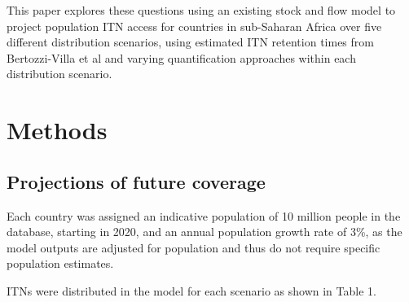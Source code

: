 \documentclass[review,
3p]{elsarticle} %
\begin{document}
This paper explores these questions using an existing stock and flow
model \citep{10.1186/s12936-022-04272-w} to project population ITN
access for countries in sub-Saharan Africa over five different
distribution scenarios, using estimated ITN retention times from
Bertozzi-Villa et al \citep{10.1038/s41467-021-23707-7} and varying
quantification approaches within each distribution scenario.

\hypertarget{methods}{%
\section{Methods}\label{methods}}

\hypertarget{projections-of-future-coverage}{%
\subsection{Projections of future
coverage}\label{projections-of-future-coverage}}

Each country was assigned an indicative population of 10 million people
in the database, starting in 2020, and an annual population growth rate
of 3\%, as the model outputs are adjusted for population and thus do not
require specific population estimates.

ITNs were distributed in the model for each scenario as shown in Table
1.
\end{document}
